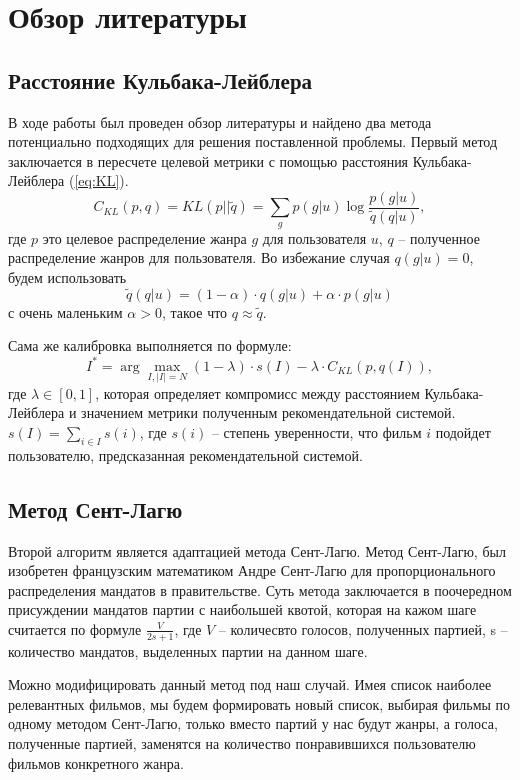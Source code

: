 \section{Обзор литературы}
\subsection{Расстояние Кульбака-Лейблера}
В ходе работы был проведен обзор литературы и найдено два метода потенциально подходящих для решения поставленной проблемы. Первый метод заключается в пересчете целевой метрики с помощью расстояния Кульбака-Лейблера (\ref{eq:KL}). \cite{voc1}
\begin{equation}
  C_{KL}(p,q) = KL(p||\tilde{q}) = \sum_g p(g|u)\log\frac{p(g|u)}{\tilde{q}(q|u)},
  \label{eq:KL}
\end{equation}
где ${p}$ это целевое распределение жанра ${g}$ для пользователя $u$, $q$ -- полученное распределение жанров для пользователя.
Во избежание случая $q(g|u)=0$, будем использовать 
\begin{equation}
  \tilde{q}(q|u) = (1-\alpha) \cdot q(g|u) + \alpha \cdot p(g|u)
\end{equation} с очень маленьким $\alpha>0$, такое что $q\approx\tilde{q}$.

Сама же калибровка выполняется по формуле: 
\begin{equation}
  \label{eq:Calibrated}
  I^*=\arg \max_{I, |I|=N} (1-\lambda) \cdot s(I) - \lambda \cdot C_{KL}(p,q(I)),
\end{equation} где $\lambda \in [0,1]$, которая определяет компромисс между расстоянием Кульбака-Лейблера и значением метрики полученным рекомендательной системой. $s(I)=\sum_{i\in I}s(i)$, где $s(i)$ -- степень уверенности, что фильм $i$ подойдет пользователю, предсказанная рекомендательной системой.
\subsection{Метод Сент-Лагю}
Второй алгоритм является адаптацией метода Сент-Лагю. \cite{voc2} Метод Сент-Лагю, был изобретен французским математиком Андре Сент-Лагю для пропорционального распределения мандатов в правительстве. Суть метода заключается в поочередном присуждении мандатов партии с наибольшей квотой, которая на кажом шаге считается по формуле $\frac{V}{2s+1}$, где $V$ -- количесвто голосов, полученных партией, s -- количество мандатов, выделенных партии на данном шаге.

Можно модифицировать данный метод под наш случай. Имея список наиболее релевантных фильмов, мы будем формировать новый список, выбирая фильмы по одному методом Сент-Лагю, только вместо партий у нас будут жанры, а голоса, полученные партией, заменятся на количество понравившихся пользователю фильмов конкретного жанра.
